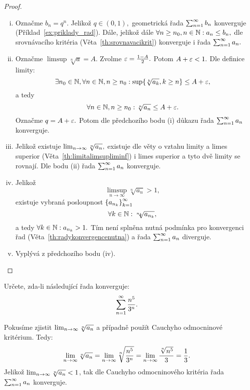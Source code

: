 \begin{proof}
    \leavevmode
    \begin{enumerate}[(i)]
        \item Označme $b_n = q^n.$ Jelikož $q \in (0,1),$ geometrická řada
            $\sum_{n=1}^\infty b_n$ konverguje (Příklad~\ref{ex:priklady_rad}). 
            Dále, jelikož dále $\forall n \geq n_0, n\in\mathbb{N}: a_n \leq b_n,$
            dle srovnávacího kritéria (Věta~\ref{th:srovnavacikrit}) konverguje
            i řada $\sum_{n=1}^\infty a_n.$

        \item Označme $\limsup \sqrt[n]{a} = A.$ Zvolme $\varepsilon = \frac{1-A}{2}.$
            Potom $A + \varepsilon < 1.$ Dle definice limity:
            $$\exists n_0 \in \mathbb{N}, \forall n\in\mathbb{N},n \geq n_0: 
            \sup\{\sqrt[k]{a_k},k\geq n\} \leq A + \varepsilon,$$
            a tedy
            $$\forall n\in\mathbb{N}, n \geq n_0: \sqrt[n]{a_n} \leq A + \varepsilon.$$ 
            Označme $q = A + \varepsilon.$ Potom dle předchozího bodu (i) důkazu 
            řada $\sum_{n=1}^\infty a_n$ konverguje.

        \item Jelikož existuje $\lim_{n \to \infty} \sqrt[n]{a_n},$ existuje dle
            věty o vztahu limity a limes superior
            (Věta~\ref{th:limitalimsupliminf}) i limes superior a tyto dvě
            limity se rovnají. Dle bodu
            (ii) řada $\sum_{n=1}^\infty a_n$ konverguje.

        \item Jelikož 
            $$\limsup_{n\to\infty} \sqrt[n]{a_n} > 1,$$
            existuje vybraná posloupnost $\left\{a_{n_k}\right\}_{k=1}^\infty$ \tz
            $$\forall k  \in \mathbb{N}: \sqrt[n_k]{a_{n_k}},$$
            a tedy $\forall k \in \mathbb{N}: a_{n_k} > 1.$ Tím není splněna nutná
            podmínka pro konvergenci řad (Věta~\ref{th:radykonvergencenutna})
            a řada $\sum_{n=1}^\infty a_n$ diverguje.

        \item Vyplývá z předchozího bodu (iv).
    \end{enumerate}
\end{proof}

\begin{example}
    Určete, zda-li následující řada konverguje:
    $$\sum_{n=1}^\infty \frac{n^5}{3^n}.$$

    Pokusíme zjistit $\lim_{n \to \infty} \sqrt[n]{a_n}$ a případně použít Cauchyho 
    odmocninové kritérium. Tedy:
    $$\lim_{n \to \infty} \sqrt[n]{a_n}
    = \lim_{n \to \infty} \sqrt[n]{\frac{n^5}{3^n}}
    = \lim_{n \to \infty} \frac{\sqrt[n]{n^5}}{3}
    = \frac{1}{3}.$$
    Jelikož $\lim_{n \to \infty} \sqrt[n]{a_n} < 1$, tak dle Cauchyho odmocninového
    kritéria řada $\sum_{n=1}^\infty a_n$ konverguje.
\end{example}

